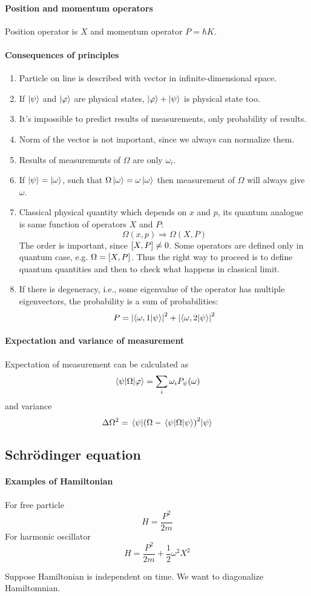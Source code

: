 \paragraph{Position and momentum operators}
Position operator is $X$ and momentum operator $P = \hbar K$.
\paragraph{Consequences of principles}
\begin{enumerate}
	\item Particle on line is described with vector in infinite-dimensional space.
	\item If $\ket{\psi}$ and $\ket{\varphi}$ are physical states, $\ket{\varphi} + \ket{\psi}$ is physical state too.
	\item It's impossible to predict results of measurements, only probability of results.
	\item Norm of the vector is not important, since we always can normalize them.
	\item Results of measurements of $\Omega$ are only $\omega_i$.
	\item If $\ket{\psi} = \ket{\omega}$, such that $\Omega \ket{\omega} = \omega\ket{\omega}$ then measurement of $\Omega$ will always give $\omega$.
	\item Classical physical quantity which depends on $x$ and $p$, its quantum analogue is same function of operators $X$ and $P$: 
	$$\Omega(x,p) \Rightarrow \Omega(X,P)$$
	The order is important, since $\comm{X}{P} \neq 0$. Some operators are defined only in quantum case, e.g. $\Omega = \comm{X}{P}$. Thus the right way to proceed is to define quantum quantities and then to check what happens in classical limit.
	\item If there is degeneracy, i.e., some eigenvalue of the operator has multiple eigenvectors, the probability is a sum of probabilities:
	$$P = \abs{\braket{\omega,1}{\psi}}^2 + \abs{\braket{\omega,2}{\psi}}^2$$
\end{enumerate}
\paragraph{Expectation and variance of measurement}
Expectation of measurement can be calculated as
$$\mel{\psi}{\Omega}{\varphi} = \sum_i \omega_i P_\psi(\omega)$$
and variance
$$\Delta \Omega^2 = \mel{\psi}{\qty(\Omega - \mel{\psi}{\Omega}{\psi})^2}{\psi}$$
\subsection{Schr\"{o}dinger equation}
\paragraph{Examples of Hamiltonian}
For free particle
$$H = \frac{P^2}{2m}$$
For harmonic oscillator
$$H = \frac{P^2}{2m} + \frac{1}{2}\omega^2 X^2$$

Suppose Hamiltonian is independent on time. We want to diagonalize Hamiltomnian.
